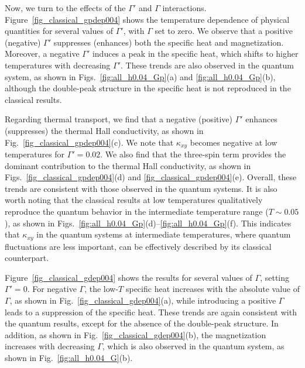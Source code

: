 \documentclass[twocolumn,superscriptaddress,showpacs, longbibliography, aps, prx]{revtex4-2}
\begin{document}
Now, we turn to the effects of the $\Gamma'$ and $\Gamma$ interactions. 
Figure~\ref{fig_classical_gpdep004} shows the temperature dependence of physical quantities for several values of $\Gamma'$, with $\Gamma$ set to zero. 
We observe that a positive (negative) $\Gamma'$ suppresses (enhances) both the specific heat and magnetization.
Moreover, a negative $\Gamma'$ induces a peak in the specific heat, which shifts to higher temperatures with decreasing $\Gamma'$.
These trends are also observed in the quantum system, as shown in Figs.~\ref{fig:all_h0.04_Gp}(a) and \ref{fig:all_h0.04_Gp}(b), although the double-peak structure in the specific heat is not reproduced in the classical results.

Regarding thermal transport, we find that a negative (positive) $\Gamma'$ enhances (suppresses) the thermal Hall conductivity, as shown in Fig.~\ref{fig_classical_gpdep004}(c).
We note that $\kappa_{xy}$ becomes negative at low temperatures for $\Gamma'=0.02$.
We also find that the three-spin term provides the dominant contribution to the thermal Hall conductivity, as shown in Figs.~\ref{fig_classical_gpdep004}(d) and \ref{fig_classical_gpdep004}(e).
Overall, these trends are consistent with those observed in the quantum systems.
It is also worth noting that the classical results at low temperatures qualitatively reproduce the quantum behavior in the intermediate temperature range ($T\sim 0.05$), as shown in Figs.~\ref{fig:all_h0.04_Gp}(d)--\ref{fig:all_h0.04_Gp}(f). 
This indicates that $\kappa_{xy}$ in the quantum systems at intermediate temperatures, where quantum fluctuations are less important, can be effectively described by its classical counterpart.

Figure~\ref{fig_classical_gdep004} shows the results for several values of $\Gamma$, setting $\Gamma'=0$.
For negative $\Gamma$, the low-$T$ specific heat increases with the absolute value of $\Gamma$, as shown in Fig.~\ref{fig_classical_gdep004}(a), while introducing a positive $\Gamma$ leads to a suppression of the specific heat.
These trends are again consistent with the quantum results, except for the absence of the double-peak structure.
In addition, as shown in Fig.~\ref{fig_classical_gdep004}(b), the magnetization increases with decreasing $\Gamma$, which is also observed in the quantum 
system, as shown in Fig.~\ref{fig:all_h0.04_G}(b).
\end{document}
